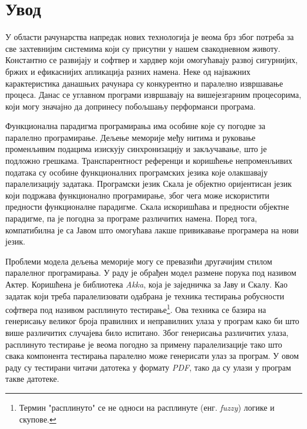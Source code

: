 \documentclass[12pt,oneside]{memoir}
\begin{document}
\frontmatter
\naslovna
\komisija
\apstrakt
\tableofcontents*

\mainmatter

\chapter{Увод}

У области рачунарства напредак нових технологија је веома брз због потреба за све захтевнијим системима који су присутни у нашем свакодневном животу. Константно се развијају и софтвер и хардвер који омогућавају развој сигурнијих, бржих и ефикаснијих апликација разних намена. Неке од најважних карактеристика данашњих рачунара су конкурентно и паралелно извршавање процеса. Данас се углавном програми извршавају на вишејезгарним процесорима, који могу значајно да допринесу побољшању перформанси програма. 

Функционална парадигма програмирања има особине које су погодне за паралелно програмирање. Дељење меморије међу нитима и руковање променљивим подацима изискују синхронизацију и закључавање, што је подложно грешкама. Транспарентност референци и коришћење непроменљивих података су особине функционалних програмских језика које олакшавају паралелизацију задатака. Програмски језик Скала је објектно оријентисан језик који подржава функционално програмирање, због чега може искористити предности функционалне парадигме. Скала искоришћава и предности објектне парадигме, па је погодна за програме различитих намена. Поред тога, компатибилна је са Јавом што омогућава лакше привикавање програмера на нови језик.

Проблеми модела дељења меморије могу се превазићи другачијим стилом паралелног програмирања. У раду је обрађен модел размене порука под називом Актер. Коришћена је библиотека \textit{Akka}, која је заједничка за Јаву и Скалу. Као задатак који треба паралелизовати одабрана је техника тестирања робусности софтвера под називом расплинуто тестирање\footnote{Термин "расплинуто" се не односи на расплинуте (енг. \textit{fuzzy}) логике и скупове.}. Ова техника се базира на генерисању великог броја правилних и неправилних улаза у програм како би што више различитих случајева било испитано. Због генерисања различитих улаза, расплинуто тестирање је веома погодно за примену паралелизације тако што свака компонента тестирања паралелно може генерисати улаз за програм. У овом раду су тестирани читачи датотека у формату \textit{PDF}, тако да су улази у програм такве датотеке.
\end{document}
